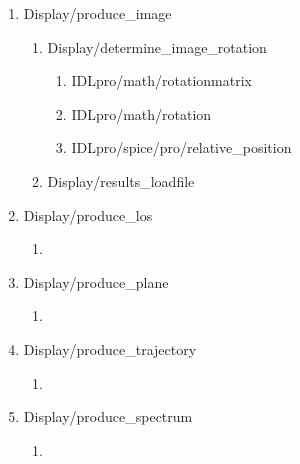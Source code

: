\documentclass[11pt]{article}
\begin{document}
\begin{enumerate}
\begin{enumerate}
  \item Display/produce\_image
    \begin{enumerate}
    \item Display/determine\_image\_rotation
      \begin{enumerate}
      \item IDLpro/math/rotationmatrix
      \item IDLpro/math/rotation
      \item IDLpro/spice/pro/relative\_position
      \end{enumerate}
    \item Display/results\_loadfile
    \end{enumerate}
  \item Display/produce\_los
    \begin{enumerate}
    \item \color{red}{continue}
    \end{enumerate}

  \item Display/produce\_plane
    \begin{enumerate}
    \item \color{red}{continue}
    \end{enumerate}

  \item Display/produce\_trajectory
    \begin{enumerate}
    \item \color{red}{continue}
    \end{enumerate}

  \item Display/produce\_spectrum
    \begin{enumerate}
    \item \color{red}{continue}
    \end{enumerate}
  \end{enumerate}
\end{enumerate}
\end{document}
